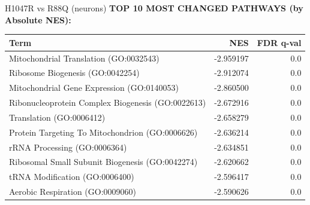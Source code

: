 \documentclass[10pt, aspectratio=169]{beamer}
\begin{document}
\begin{frame}{H1047R vs R88Q (neurons)}
  \centering
  {\small \textbf{TOP 10 MOST CHANGED PATHWAYS (by Absolute NES):}}\par
  \vspace{0.15cm}
  \scriptsize
  \begin{tabular}{p{8cm} r r}
    \toprule
    \textbf{Term} & \textbf{NES} & \textbf{FDR q-val} \\
    \midrule
    Mitochondrial Translation (GO:0032543) & -2.959197 & 0.0 \\
    Ribosome Biogenesis (GO:0042254) & -2.912074 & 0.0 \\
    Mitochondrial Gene Expression (GO:0140053) & -2.860500 & 0.0 \\
    Ribonucleoprotein Complex Biogenesis (GO:0022613) & -2.672916 & 0.0 \\
    Translation (GO:0006412) & -2.658279 & 0.0 \\
    Protein Targeting To Mitochondrion (GO:0006626) & -2.636214 & 0.0 \\
    rRNA Processing (GO:0006364) & -2.634851 & 0.0 \\
    Ribosomal Small Subunit Biogenesis (GO:0042274) & -2.620662 & 0.0 \\
    tRNA Modification (GO:0006400) & -2.596417 & 0.0 \\
    Aerobic Respiration (GO:0009060) & -2.590626 & 0.0 \\
    \bottomrule
  \end{tabular}
\end{frame}
\end{document}
